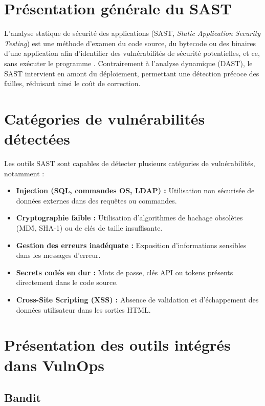 \documentclass[12pt, a4paper, oneside]{report}
\begin{document}
\section{Présentation générale du SAST}

L'analyse statique de sécurité des applications (SAST, \textit{Static Application
Security Testing}) est une méthode d'examen du code source, du bytecode ou des
binaires d'une application afin d'identifier des vulnérabilités de sécurité
potentielles, et ce, sans exécu\-ter le programme \cite{owasptop10}. Contrairement
à l'analyse dynamique (DAST), le SAST intervient en amont du déploiement,
permettant une détection précoce des failles, réduisant ainsi le coût de correction.

\section{Catégories de vulnérabilités détectées}

Les outils SAST sont capables de détecter plusieurs catégories de vulnérabilités,
notamment :

\begin{itemize}
    \item \textbf{Injection (SQL, commandes OS, LDAP) :} Utilisation non sécurisée
    de données externes dans des requêtes ou commandes.
    \item \textbf{Cryptographie faible :} Utilisation d'algorithmes de hachage
    obsolètes (MD5, SHA-1) ou de clés de taille insuffisante.
    \item \textbf{Gestion des erreurs inadéquate :} Exposition d'informations
    sensibles dans les messages d'erreur.
    \item \textbf{Secrets codés en dur :} Mots de passe, clés API ou tokens
    présents directement dans le code source.
    \item \textbf{Cross-Site Scripting (XSS) :} Absence de validation et
    d'échappement des données utilisateur dans les sorties HTML.
\end{itemize}

\section{Présentation des outils intégrés dans VulnOps}

\subsection{Bandit}
\end{document}
